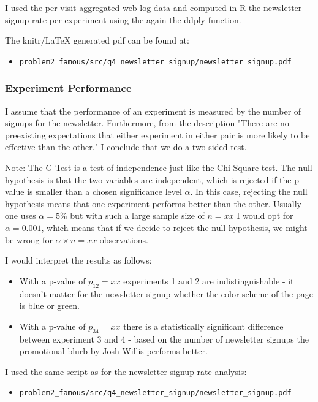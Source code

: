 \documentclass{article}\usepackage[]{graphicx}\usepackage[]{color}
\begin{document}
I used the per visit aggregated web log data and computed in R the newsletter signup rate per experiment using the again the ddply function.

\bigskip
The knitr/LaTeX generated pdf can be found at:
\begin{itemize}
	\item \verb+problem2_famous/src/q4_newsletter_signup/newsletter_signup.pdf+
\end{itemize}



\subsubsection{Experiment Performance} %
\label{subsub:performance}

I assume that the performance of an experiment is measured by the number of signups for the newsletter. Furthermore, from the description "There are no preexisting expectations that either experiment in either pair is more likely to be effective than the other." I conclude that we do a two-sided test.

Note: The G-Test is a test of independence just like the Chi-Square test. The null hypothesis is that the two variables are independent, which is rejected if the p-value is smaller than a chosen significance level $\alpha$. In this case, rejecting the null hypothesis means that one experiment performs better than the other.
Usually one uses $\alpha=5\%$ but with such a large sample size of $n=xx$ I would opt for $\alpha=0.001$, which means that if we decide to reject the null hypothesis, we might be wrong for $\alpha \times n=xx$ observations.

I would interpret the results as follows: 
\begin{itemize}
	\item With a p-value of $p_{12}=xx$ experiments 1 and 2 are indistinguishable - it doesn't matter for the newsletter signup whether the color scheme of the page is blue or green.
	\item With a p-value of $p_{34}=xx$ there is a statistically significant difference between experiment 3 and 4 - based on the number of newsletter signups the promotional blurb by Josh Willis performs better.	 
\end{itemize}

\bigskip
I used the same script as for the newsletter signup rate analysis:
\begin{itemize}
	\item \verb+problem2_famous/src/q4_newsletter_signup/newsletter_signup.pdf+
\end{itemize}
\end{document}
